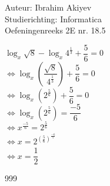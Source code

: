 \documentclass[a4paper]{article}
\begin{document}
\noindent \large Auteur: Ibrahim Akiyev \\
\noindent \large Studierichting: Informatica\\
\noindent \large Oefeningenreeks 2E nr. 18.5\\

\medskip

\normalsize

$\log_{x}\sqrt{8} - \log_{x}4^{\tfrac{1}{3}} +\dfrac{5}{6} = 0$\\

$\Leftrightarrow\log_{x}\left(\dfrac{\sqrt{8}}{4^{\tfrac{1}{3}}}\right) + \dfrac{5}{6} = 0$\\

$\Leftrightarrow\log_{x}(2^{\tfrac{5}{6}}) + \dfrac{5}{6} = 0$\\

$\Leftrightarrow\log_{x}(2^{\tfrac{5}{6}}) = \dfrac{-5}{6}$\\

$\Leftrightarrow x^{\tfrac{-5}{6}} = 2^{\tfrac{5}{6}}$\\

$\Leftrightarrow x = 2^{\left({\tfrac{5}{6}}\right)^{\tfrac{-6}{5}}}$\\

$\Leftrightarrow x = \dfrac{1}{2}$\\

\begin{thebibliography}{999}
\end{thebibliography}
\end{document}
